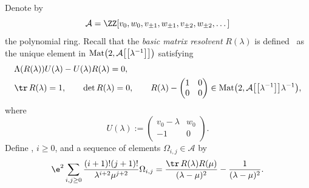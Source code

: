 Denote by
\[
\mathcal{A}=\ZZ[v_0, w_0, v_{\pm1}, w_{\pm 1}, v_{\pm 2}, w_{\pm 2}, \dots]
\]
the polynomial ring.
Recall that the {\it basic matrix resolvent} $R(\lambda)$ is defined~\cite{DY} as
the unique element in ${\rm Mat}\bigl(2,\mathcal{A}\bigl[\bigl[\lambda^{-1}\bigr]\bigr]\bigr)$ satisfying
\begin{align*}
& \Lambda(R(\lambda)) U(\lambda) - U(\lambda) R(\lambda) =0,\\
& \tr \, R(\lambda) =1, \qquad \det R(\lambda)=0,\qquad
 R(\lambda) - \begin{pmatrix} 1 & 0 \\ 0 & 0 \\ \end{pmatrix} \in {\rm Mat}\bigl(2,\mathcal{A}\bigl[\bigl[\lambda^{-1}\bigr]\bigr]\lambda^{-1}\bigr), %
\end{align*}
where
\[
U(\lambda) := \begin{pmatrix} v_0-\lambda & w_0 \\ -1 & 0 \\ \end{pmatrix}.
\]
Define , $i\geq0$, and
a sequence of elements $\Omega_{i,j} \in \mathcal{A}$ by
\[
\e^2\sum_{i,j\geq0} \frac{(i+1)!(j+1)!}{\lambda^{i+2} \mu^{j+2}}\Omega_{i,j} = \frac{\tr \, R(\lambda)R(\mu)}{(\lambda-\mu)^2} - \frac{1}{(\lambda-\mu)^2}.
\]

